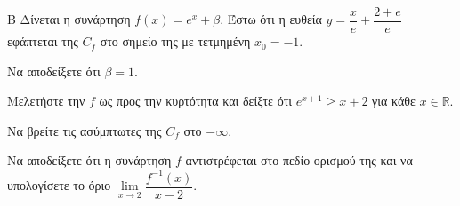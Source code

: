 \begin{thema}{Β}
Δίνεται η συνάρτηση $f(x) = e^x + \beta$. Έστω ότι η ευθεία $y = \dfrac{x}{e}+\dfrac{2+e}{e}$ εφάπτεται της $C_f$ στο σημείο της με τετμημένη $x_0=-1$.
\begin{erwthma}
  \item Να αποδείξετε ότι $\beta=1$.
  \item Μελετήστε την $f$ ως προς την κυρτότητα και δείξτε ότι $e^{x+1}\geq x+2$ για κάθε $x\in\mathbb{R}$.
  \item Να βρείτε τις ασύμπτωτες της $C_f$ στο $-\infty$.
  \item Να αποδείξετε ότι η συνάρτηση $f$ αντιστρέφεται στο πεδίο ορισμού της και να υπολογίσετε το όριο $\lim\limits_{x \to 2} \dfrac{f^{-1}(x)}{x-2}$.
\end{erwthma}
\end{thema}
